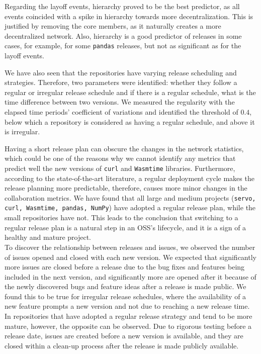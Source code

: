 Regarding the layoff events, hierarchy proved to be the best predictor, as all events coincided with a spike in hierarchy towards more decentralization. This is justified by removing the core members, as it naturally creates a more decentralized network. Also, hierarchy is a good predictor of releases in some cases, for example, for some \texttt{pandas} releases, but not as significant as for the layoff events.

We have also seen that the repositories have varying release scheduling and strategies. Therefore, two parameters were identified: whether they follow a regular or irregular release schedule and if there is a regular schedule, what is the time difference between two versions. We measured the regularity with the elapsed time periods' coefficient of variations and identified the threshold of $0.4$, below which a repository is considered as having a regular schedule, and above it is irregular.

Having a short release plan can obscure the changes in the network statistics, which could be one of the reasons why we cannot identify any metrics that predict well the new versions of \texttt{curl} and \texttt{Wasmtime} libraries. Furthermore, according to the state-of-the-art literature, a regular deployment cycle makes the release planning more predictable, therefore, causes more minor changes in the collaboration metrics. We have found that all large and medium projects (\texttt{servo, curl, Wasmtime, pandas, NumPy}) have adopted a regular release plan, while the small repositories have not. This leads to the conclusion that switching to a regular release plan is a natural step in an OSS's lifecycle, and it is a sign of a healthy and mature project. \\

To discover the relationship between releases and issues, we observed the number of issues opened and closed with each new version. We expected that significantly more issues are closed before a release due to the bug fixes and features being included in the next version, and significantly more are opened after it because of the newly discovered bugs and feature ideas after a release is made public. We found this to be true for irregular release schedules, where the availability of a new feature prompts a new version and not due to reaching a new release time. In repositories that have adopted a regular release strategy and tend to be more mature, however, the opposite can be observed. Due to rigorous testing before a release date, issues are created before a new version is available, and they are closed within a clean-up process after the release is made publicly available.


